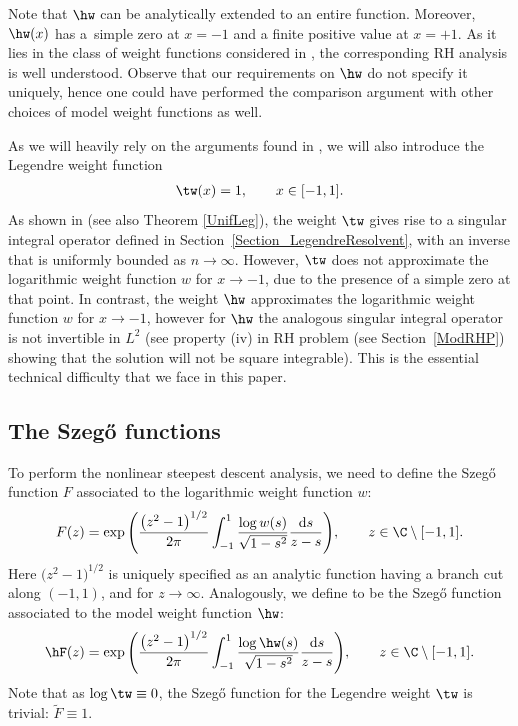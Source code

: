 Note that $\hw$ can be analytically extended to an entire function. Moreover, $\hw(x)$ has a~simple zero at $x = -1$ and a finite positive value at $x = +1$. As it lies in the class of weight functions considered in \cite{KMVV}, the corresponding RH analysis is well understood. Observe that our requirements on $\hw$ do not specify it uniquely, hence one could have performed the comparison argument with other choices of model weight functions as well.

As we will heavily rely on the arguments found in \cite{CD}, we will also introduce the Legendre weight function
\begin{align*}
 \tw(x) = 1, \qquad x \in [-1,1].
\end{align*}
As shown in \cite[Theorem 4.7]{CD} (see also Theorem \ref{UnifLeg}), the weight $\tw$ gives rise to a singular integral operator defined in Section~\ref{Section_LegendreResolvent}, with an inverse that is uniformly bounded as $n \to \infty$. However, $\tw$ does not approximate the logarithmic weight function $w$ for $x\to -1$, due to the presence of a simple zero at that point. In contrast, the weight $\hw$ approximates the logarithmic weight function $w$ for $x \to -1$, however for $\hw$ the analogous singular integral operator is not invertible in $L^2$ (see property (iv) in RH problem (see Section~\ref{ModRHP}) showing that the solution will not be square integrable). This is the essential technical difficulty that we face in this paper.

\subsection[The Szego functions]{The Szeg\H{o} functions}
To perform the nonlinear steepest descent analysis, we need to define the Szeg\H{o} function $F$ associated to the logarithmic weight function $w$:
\begin{align}\label{SzegoF}
 F(z) = \exp \Bigg( \dfrac{\big(z^2-1\big)^{1/2}}{2 \pi}\int_{-1}^1 \dfrac{\log w(s)}{\sqrt{1-s^2}} \dfrac{{\rm d}s}{z-s} \Bigg), \qquad z \in \C \setminus [-1,1].
\end{align}
Here $\big(z^2-1\big)^{1/2}$ is uniquely specified as an analytic function having a branch cut along $(-1,1)$, and  for $z\to \infty$. Analogously, we define \smash{$\hF$} to be the Szeg\H{o} function associated to the model weight function $\hw$:
\begin{align*}
 \hF(z) = \exp \Bigg( \dfrac{\big(z^2-1\big)^{1/2}}{2 \pi}\int_{-1}^1 \dfrac{\log \hw(s)}{\sqrt{1-s^2}} \dfrac{{\rm d}s}{z-s} \Bigg), \qquad z \in \C \setminus [-1,1].
\end{align*}
Note that as $\log \tw \equiv 0$, the Szeg\H{o} function for the Legendre weight $\tw$ is trivial: $\widetilde F \equiv 1$.

